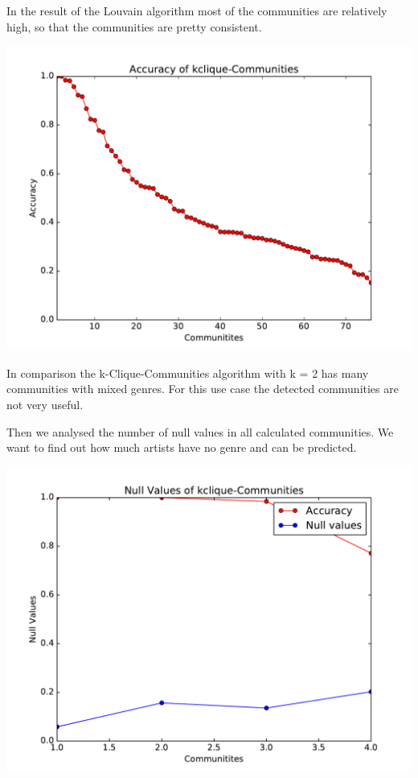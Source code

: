 \documentclass[11pt,a4paper,onecolumn,notitlepage]{article}
\begin{document}
In the result of the Louvain algorithm most of the communities are relatively high, so that the communities are pretty consistent.

\includegraphics[scale=0.4]{spotify_acc_kclique.pdf}

In comparison the k-Clique-Communities algorithm with k = 2 has many communities with mixed genres. For this use case the detected communities are not very useful.

Then we analysed the number of null values in all calculated communities. We want to find out how much artists have no genre and can be predicted.

\includegraphics[scale=0.4]{spotify_null_kclique.pdf}
\end{document}
